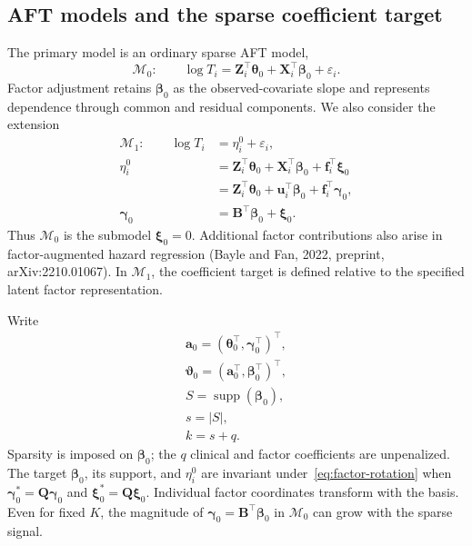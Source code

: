 \subsection{AFT models and the sparse coefficient target}
\label{subsec:aft-models}
The primary model is an ordinary sparse AFT model,
\begin{equation}
 \mathcal M_0:\qquad
 \log T_i=\bm{Z}_i^\top\bm{\theta}_0+\bm{X}_i^\top\bm{\beta}_0+\varepsilon_i.
 \label{eq:ordinary-aft}
\end{equation}
Factor adjustment retains $\bm{\beta}_0$ as the observed-covariate slope and represents dependence through common and residual components. We also consider the extension
\begin{equation}
\begin{aligned}
\mathcal M_1:\qquad\log T_i&=\eta_i^0+\varepsilon_i,\\
\eta_i^0&=\bm Z_i^\top\bm\theta_0+\bm X_i^\top\bm\beta_0+\bm f_i^\top\bm\xi_0\\
&=\bm Z_i^\top\bm\theta_0+\bm u_i^\top\bm\beta_0+\bm f_i^\top\bm\gamma_0,\\
\bm\gamma_0&=\bm B^\top\bm\beta_0+\bm\xi_0.
\end{aligned}
\label{eq:augmented-aft}
\end{equation}
Thus $\mathcal M_0$ is the submodel $\bm{\xi}_0=0$. Additional factor contributions also arise in factor-augmented hazard regression (Bayle and Fan, 2022, preprint, arXiv:2210.01067). In $\mathcal M_1$, the coefficient target is defined relative to the specified latent factor representation.

Write
\begin{equation}
 \begin{gathered}
\bm{a}_0=(\bm{\theta}_0^\top,\bm{\gamma}_0^\top)^\top,\\
 \bm{\vartheta}_0=(\bm{a}_0^\top,\bm{\beta}_0^\top)^\top,\\
 S=\operatorname{supp}(\bm{\beta}_0),\\
 s=|S|,\\
 k=s+q.
 \end{gathered}
 \label{eq:parameter-notation}
\end{equation}
Sparsity is imposed on $\bm{\beta}_0$; the $q$ clinical and factor coefficients are unpenalized. The target $\bm{\beta}_0$, its support, and $\eta_i^0$ are invariant under~\eqref{eq:factor-rotation} when $\bm{\gamma}_0^*=\bm{Q}\bm{\gamma}_0$ and $\bm{\xi}_0^*=\bm{Q}\bm{\xi}_0$. Individual factor coordinates transform with the basis. Even for fixed $K$, the magnitude of $\bm{\gamma}_0=\bm{B}^\top\bm{\beta}_0$ in $\mathcal M_0$ can grow with the sparse signal.

